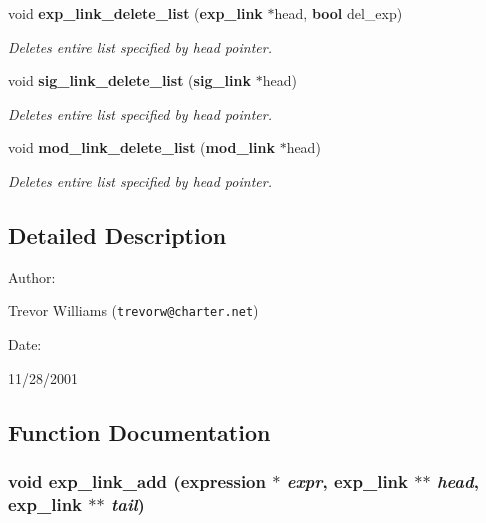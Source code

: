 \begin{CompactItemize}
void {\bf exp\_\-link\_\-delete\_\-list} ({\bf exp\_\-link} $\ast$head, {\bf bool} del\_\-exp)
\begin{CompactList}\small\item\em Deletes entire list specified by head pointer.\item\end{CompactList}\item 
void {\bf sig\_\-link\_\-delete\_\-list} ({\bf sig\_\-link} $\ast$head)
\begin{CompactList}\small\item\em Deletes entire list specified by head pointer.\item\end{CompactList}\item 
void {\bf mod\_\-link\_\-delete\_\-list} ({\bf mod\_\-link} $\ast$head)
\begin{CompactList}\small\item\em Deletes entire list specified by head pointer.\item\end{CompactList}\end{CompactItemize}


\subsection{Detailed Description}


\begin{Desc}
\item[Author: ]\par
Trevor Williams ({\tt trevorw@charter.net}) \end{Desc}
\begin{Desc}
\item[Date: ]\par
11/28/2001\end{Desc}


\subsection{Function Documentation}
\subsubsection{\setlength{\rightskip}{0pt plus 5cm}void exp\_\-link\_\-add ({\bf expression} $\ast$ {\em expr}, {\bf exp\_\-link} $\ast$$\ast$ {\em head}, {\bf exp\_\-link} $\ast$$\ast$ {\em tail})}\label{link_8c_a1}


